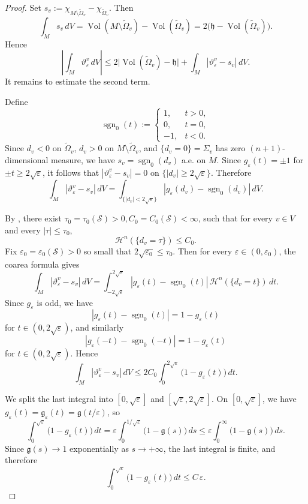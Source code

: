 \documentclass[12pt,english]{article}
\theoremstyle{definition}
\begin{document}
\begin{proof}
Set $s_v:=\chi_{M\setminus \widetilde\Omega_v}-\chi_{\widetilde\Omega_v}$.
Then
\[
\int_M s_v\,dV
=
\operatorname{Vol}(M\setminus \widetilde\Omega_v)-\operatorname{Vol}(\widetilde\Omega_v)
=
2\bigl(\mathfrak h-\operatorname{Vol}(\widetilde\Omega_v)\bigr).
\]
Hence
\[
\left|\int_M \vartheta_\varepsilon^v\,dV\right|
\le
2\bigl|\operatorname{Vol}(\widetilde\Omega_v)-\mathfrak h\bigr|
+
\int_M |\vartheta_\varepsilon^v-s_v|\,dV.
\]
It remains to estimate the second term.

Define
\[
\operatorname{sgn}_0(t):=
\begin{cases}
1,& t>0,\\
0,& t=0,\\
-1,& t<0.
\end{cases}
\]
Since $d_v<0$ on $\widetilde\Omega_v$, $d_v>0$ on $M\setminus \widetilde\Omega_v$, and $\{d_v=0\}=\Sigma_v$ has zero $(n+1)$-dimensional measure, we have $s_v=\operatorname{sgn}_0(d_v)$
a.e. on $M$. Since $g_\varepsilon(t)=\pm 1$ for $\pm t\ge 2\sqrt{\varepsilon}$, it follows that $|\vartheta_\varepsilon^v-s_v|=0$ on $\{|d_v|\ge 2\sqrt{\varepsilon}\}$. Therefore
\[
\int_M |\vartheta_\varepsilon^v-s_v|\,dV
=
\int_{\{|d_v|<2\sqrt{\varepsilon}\}}
|g_\varepsilon(d_v)-\operatorname{sgn}_0(d_v)|\,dV.
\]

By \cite[(3.68)--(3.69)]{Dey}, there exist $ \tau_0=\tau_0(\mathscr S)>0, C_0=C_0(\mathscr S)<\infty$, such that for every $v\in V$ and every $|\tau|\le \tau_0$,
\[
\mathcal H^n(\{d_v=\tau\})\le C_0.
\]
Fix $\varepsilon_0=\varepsilon_0(\mathscr S)>0$ so small that $2\sqrt{\varepsilon_0}\le\tau_0$.
Then for every $\varepsilon\in(0,\varepsilon_0)$, the coarea formula gives
\[
\int_M |\vartheta_\varepsilon^v-s_v|\,dV
=
\int_{-2\sqrt{\varepsilon}}^{2\sqrt{\varepsilon}}
|g_\varepsilon(t)-\operatorname{sgn}_0(t)|\,\mathcal H^n(\{d_v=t\})\,dt.
\]
Since $g_\varepsilon$ is odd, we have
\[
|g_\varepsilon(t)-\operatorname{sgn}_0(t)|=1-g_\varepsilon(t)
\]
for $t\in(0,2\sqrt{\varepsilon})$, and similarly
\[
|g_\varepsilon(-t)-\operatorname{sgn}_0(-t)|=1-g_\varepsilon(t)
\]
for $t\in(0,2\sqrt{\varepsilon})$. Hence
\[
\int_M |\vartheta_\varepsilon^v-s_v|\,dV
\le
2C_0\int_0^{2\sqrt{\varepsilon}} \bigl(1-g_\varepsilon(t)\bigr)\,dt.
\]

We split the last integral into $[0,\sqrt{\varepsilon}]$ and $[\sqrt{\varepsilon},2\sqrt{\varepsilon}]$.
On $[0,\sqrt{\varepsilon}]$, we have $g_\varepsilon(t)=\mathfrak g_\varepsilon(t)=\mathfrak g(t/\varepsilon)$, so
\[
\int_0^{\sqrt{\varepsilon}} \bigl(1-g_\varepsilon(t)\bigr)\,dt
=
\varepsilon\int_0^{1/\sqrt{\varepsilon}} \bigl(1-\mathfrak g(s)\bigr)\,ds
\le
\varepsilon\int_0^\infty \bigl(1-\mathfrak g(s)\bigr)\,ds.
\]
Since $\mathfrak g(s)\to 1$ exponentially as $s\to+\infty$, the last integral is finite, and therefore
\[
\int_0^{\sqrt{\varepsilon}} \bigl(1-g_\varepsilon(t)\bigr)\,dt
\le C\,\varepsilon.
\]


\end{proof}
\end{document}
